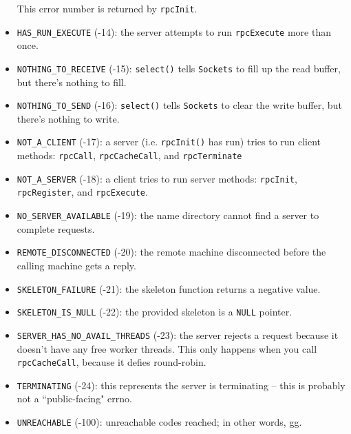 \begin{itemize}
This error number is returned by {\tt rpcInit}.
\item
{\tt HAS\_RUN\_EXECUTE} (-14): the server attempts to run {\tt rpcExecute} more than once.
\item
{\tt NOTHING\_TO\_RECEIVE} (-15): {\tt select()} tells {\tt Sockets} to fill up the read buffer, but there's nothing to fill.
\item
{\tt NOTHING\_TO\_SEND} (-16): {\tt select()} tells {\tt Sockets} to clear the write buffer, but there's nothing to write.
\item
{\tt NOT\_A\_CLIENT} (-17): a server (i.e. {\tt rpcInit()} has run) tries to run client methods: {\tt rpcCall}, {\tt rpcCacheCall}, and {\tt rpcTerminate}
\item
{\tt NOT\_A\_SERVER} (-18): a client tries to run server methods: {\tt rpcInit}, {\tt rpcRegister}, and {\tt rpcExecute}.
\item
{\tt NO\_SERVER\_AVAILABLE} (-19): the name directory cannot find a server to complete requests.
\item
{\tt REMOTE\_DISCONNECTED} (-20): the remote machine disconnected before the calling machine gets a reply.
\item
{\tt SKELETON\_FAILURE} (-21): the skeleton function returns a negative value.
\item
{\tt SKELETON\_IS\_NULL} (-22): the provided skeleton is a {\tt NULL} pointer.
\item
{\tt SERVER\_HAS\_NO\_AVAIL\_THREADS} (-23): the server rejects a request because it doesn't have any free worker threads.
This only happens when you call {\tt rpcCacheCall}, because it defies round-robin.
\item
{\tt TERMINATING} (-24): this represents the server is terminating -- this is probably not a ``public-facing" errno.
\item
{\tt UNREACHABLE} (-100): unreachable codes reached; in other words, gg.
\end{itemize}

